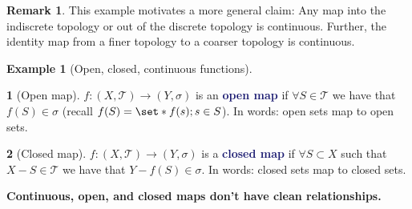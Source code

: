 \documentclass[11pt]{article}
\numberwithin{equation}{section}
\newcommand{\navy}[1]{\textcolor{MidnightBlue}{\bf #1}}
\theoremstyle{plain}
\theoremstyle{definition}
\newtheorem{definition}{\color{MidnightBlue}{\textbf{Definition}}}[section]
\newtheorem{example}{\color{WildStrawberry}Example}[section]
\newtheorem*{remark}{Remark}
\def\Set{\set*}%
\def\ss{\subset}
\newcommand{\1}{\mathbbm 1}
\newcommand{\tT}{\mathcal T}
\begin{document}
\begin{remark}
	This example motivates a more general claim: Any map into the indiscrete topology or out of the discrete topology is continuous. Further, the identity map from a finer topology to a coarser topology is continuous. 
\end{remark}


\begin{example}[Open, closed, continuous functions]
	\begin{definition}[Open map]
		$f: (X,\tT) \to (Y,\sigma)$ is an \navy{open map} if $\forall S \in \tT$ we have that $f(S) \in \sigma$ (recall $f(S) = \Set{f(s);s \in S}$). In words: open sets map to open sets. 
	\end{definition}

	\begin{definition}[Closed map]
		$f: (X,\tT) \to (Y,\sigma)$ is a \navy{closed map} if $\forall S \ss X$ such that $X - S \in \tT$ we have that $Y - f(S) \in \sigma$. In words: closed sets map to closed sets. 
	\end{definition}
	
	\textbf{Continuous, open, and closed maps don't have clean relationships.} 


\end{example}
\end{document}
